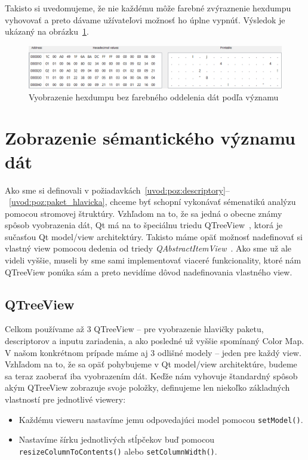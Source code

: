Takisto si uvedomujeme, že nie každému môže farebné zvýraznenie hexdumpu vyhovovať a preto dávame užívateľovi možnosť ho úplne vypnúť. Výsledok je ukázaný na obrázku~\ref{obr:kap3:hexdump_clear}.

\begin{figure}[!htb]
	\centering
	\includegraphics[width=\textwidth]{img/kap03_hexdump_clear}
	\caption{Vyobrazenie hexdumpu bez farebného oddelenia dát podľa významu}
	\label{obr:kap3:hexdump_clear}
\end{figure}

\section{Zobrazenie sémantického významu dát}
Ako sme si definovali v požiadavkách~\ref{uvod:poz:descriptory}--~\ref{uvod:poz:paket_hlavicka}, chceme byť schopní vykonávať sémenatikú analýzu pomocou stromovej štruktúry. Vzhľadom na to, že sa jedná o obecne známy spôsob vyobrazenia dát, Qt má na to špeciálnu triedu QTreeView~\cite{qtreeview}, ktorá je sučasťou Qt model/view architektúry. Takisto máme opäť možnosť nadefinovať si vlastný view pomocou dedenia od triedy \textit{QAbstractItemView}~\cite{qabstractitemview}. Ako sme už ale videli vyššie, museli by sme sami implementovať viaceré funkcionality, ktoré nám QTreeView ponúka sám a preto nevidíme dôvod nadefinovania vlastného view.

\subsection*{QTreeView}
Celkom používame až 3 QTreeView -- pre vyobrazenie hlavičky paketu, descriptorov a inputu zariadenia, a ako posledné už vyššie spomínaný Color Map. V našom konkrétnom prípade máme aj 3 odlišné modely -- jeden pre každý view. Vzhľadom na to, že sa opäť pohybujeme v Qt model/view architektúre, budeme sa teraz zaoberať iba vyobrazením dát. Keďže nám vyhovuje štandardný spôsob akým QTreeView zobrazuje svoje položky, definujeme len niekoľko základných vlastností pre jednotlivé viewery:
\begin{itemize}
\item Každému vieweru nastavíme jemu odpovedajúci model pomocou \texttt{setModel()}.
\item Nastavíme šírku jednotlivých stĺpčekov buď pomocou \texttt{resizeColumnToContents()} alebo \texttt{setColumnWidth()}.
\end{itemize}

